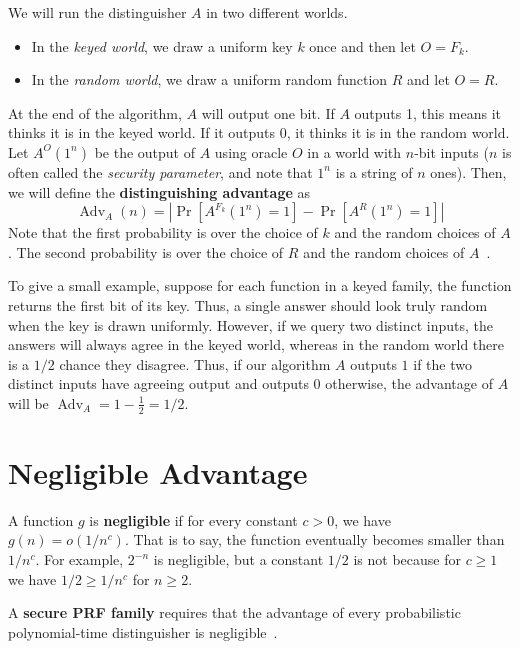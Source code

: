 \documentclass[11pt,fleqn]{article}
\newcommand{\Adv}{\operatorname{Adv}}
\begin{document}
We will run the distinguisher $A$ in two different worlds.

\begin{itemize}
    \item In the \textit{keyed world}, we draw a uniform key $k$ once and then let $O = F_k$.
    \item In the \textit{random world}, we draw a uniform random function $R$ and let $O = R$.
\end{itemize}

At the end of the algorithm, $A$ will output one bit. If $A$ outputs 1, this means it thinks it is in the keyed world. If it outputs 0, it thinks it is in the random world. Let $A^O(1^n)$ be the output of $A$ using oracle $O$ in a world with $n$-bit inputs ($n$ is often called the \textit{security parameter}, and note that $1^n$ is a string of $n$ ones). Then, we will define the \textbf{distinguishing advantage} as
\[\boxed{\Adv_A(n) = |\Pr[A^{F_k}(1^n) = 1] - \Pr[A^{R}(1^n) = 1]|}\]
Note that the first probability is over the choice of $k$ and the random choices of $A$. The second probability is over the choice of $R$ and the random choices of $A$~\cite{stanford}.\par

To give a small example, suppose for each function in a keyed family, the function returns the first bit of its key. Thus, a single answer should look truly random when the key is drawn uniformly. However, if we query two distinct inputs, the answers will always agree in the keyed world, whereas in the random world there is a $1/2$ chance they disagree. Thus, if our algorithm $A$ outputs $1$ if the two distinct inputs have agreeing output and outputs $0$ otherwise, the advantage of $A$ will be $\Adv_A = 1 - \frac{1}{2} = 1/2$.

\section{Negligible Advantage}

A function $g$ is \textbf{negligible} if for every constant $c > 0$, we have $g(n) = o(1/n^c)$. That is to say, the function eventually becomes smaller than $1/n^c$. For example, $2^{-n}$ is negligible, but a constant $1 / 2$ is not because for $c \geq 1$ we have $1 / 2 \geq 1/n^c$ for $n \geq 2$.\par

A \textbf{secure PRF family} requires that the advantage of every probabilistic polynomial-time distinguisher is negligible~\cite{mit}.
\end{document}
